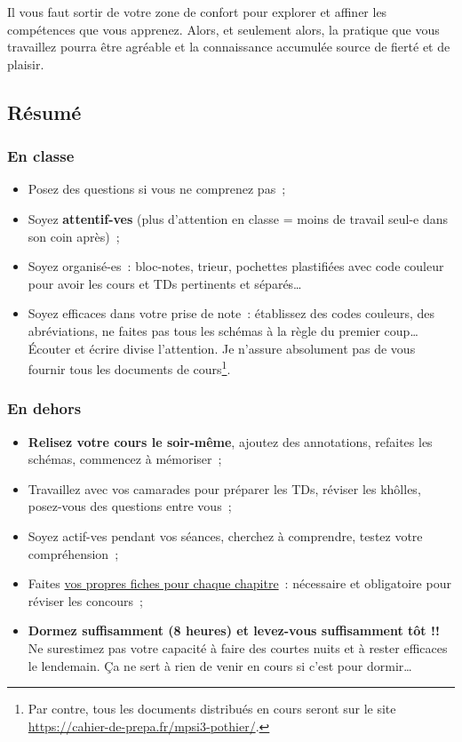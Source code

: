 \documentclass[a4paper, 12pt, final, garamond]{book}
\begin{document}
Il vous faut sortir de votre zone de confort pour explorer et affiner les
compétences que vous apprenez. Alors, et seulement alors, la pratique que vous
travaillez pourra être agréable et la connaissance accumulée source de fierté et
de plaisir.

\subsection{Résumé}
\subsubsection{En classe}
\begin{itemize}
    \item Posez des questions si vous ne comprenez pas~;
    \item Soyez \textbf{attentif-ves} (plus d'attention en classe = moins de
        travail seul-e dans son coin après)~;
    \item Soyez organisé-es~: bloc-notes, trieur, pochettes plastifiées avec
        code couleur pour avoir les cours et TDs pertinents et séparés…
    \item Soyez efficaces dans votre prise de note~: établissez des codes
        couleurs, des abréviations, ne faites pas tous les schémas à la règle du
        premier coup… Écouter et écrire divise l'attention. Je n'assure
        absolument pas de vous fournir tous les documents de cours\footnote{Par
            contre, tous les documents distribués en cours seront sur le site
            \href{https://cahier-de-prepa.fr/mpsi3-pothier/}
        {https://cahier-de-prepa.fr/mpsi3-pothier/}.}.
\end{itemize}

\subsubsection{En dehors}
\begin{itemize}
    \item \textbf{Relisez votre cours le soir-même}, ajoutez des annotations,
        refaites les schémas, commencez à mémoriser~;
    \item Travaillez avec vos camarades pour préparer les TDs, réviser les
        khôlles, posez-vous des questions entre vous~;
    \item Soyez actif-ves pendant vos séances, cherchez à comprendre, testez
        votre compréhension~;
    \item Faites \underline{vos propres fiches pour chaque chapitre}~:
        nécessaire et obligatoire pour réviser les concours~;
    \item \textbf{Dormez suffisamment (8 heures) et levez-vous suffisamment tôt
        !!} Ne surestimez pas votre capacité à faire des courtes nuits et à
        rester efficaces le lendemain. Ça ne sert à rien de venir en cours si
        c'est pour dormir…
\end{itemize}
\end{document}
